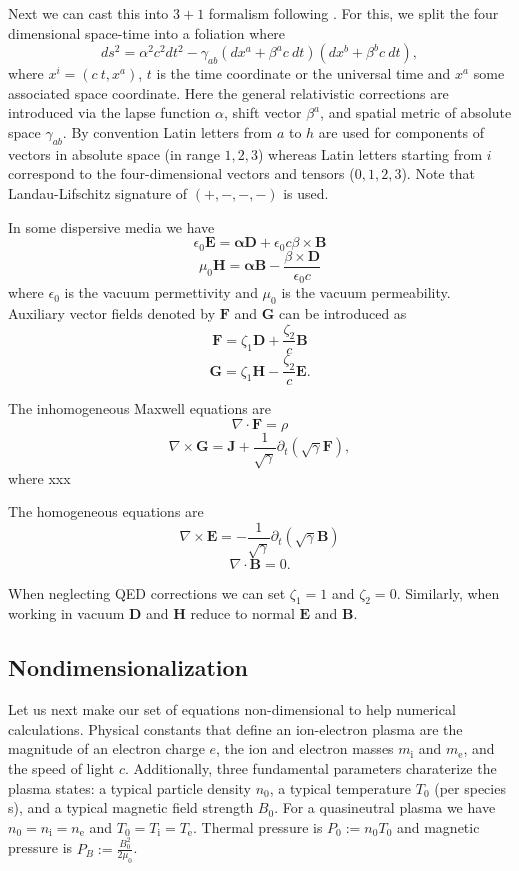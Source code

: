 \documentclass{aa}
\newcommand{\be}{\begin{equation}}
\newcommand{\ee}{\end{equation}}
\renewcommand{\vec}[1]{\ensuremath{\boldsymbol{#1}}}
\begin{document}
Next we can cast this into $3+1$ formalism following \citealt{P15}.
For this, we split the four dimensional space-time into a foliation where 
\be
ds^2 = \alpha^2 c^2 dt^2 - \gamma_{ab}(dx^a + \beta^a c~dt)(dx^b + \beta^b c~dt),
\ee
where $x^i = (c~t, x^a)$, $t$ is the time coordinate or the universal time and $x^a$ some associated space coordinate.
Here the general relativistic corrections are introduced via the lapse function $\alpha$, shift vector $\beta^a$, and spatial metric of absolute space $\gamma_{ab}$.
By convention Latin letters from $a$ to $h$ are used for components of vectors in absolute space (in range ${1,2,3}$) whereas Latin letters starting from $i$ correspond to the four-dimensional vectors and tensors (${0,1,2,3}$).
Note that Landau-Lifschitz signature of $(+,-,-,-)$ is used.

In some dispersive media we have
\be
\epsilon_0 \vec{E} = \vec{\alpha} \vec{D} + \epsilon_0 c \beta \times \vec{B}
\ee
\be
\mu_0 \vec{H} = \vec{\alpha} \vec{B} - \frac{\beta \times \vec{D}}{\epsilon_0 c}
\ee
where $\epsilon_0$ is the vacuum permettivity and $\mu_0$ is the vacuum permeability.
Auxiliary vector fields denoted by $\vec{F}$ and $\vec{G}$ can be introduced as
\be
\vec{F} = \zeta_1 \vec{D} + \frac{\zeta_2}{c} \vec{B}
\ee
\be
\vec{G} = \zeta_1 \vec{H} - \frac{\zeta_2}{c} \vec{E}.
\ee

The inhomogeneous Maxwell equations are
\be
\nabla \cdot \vec{F} = \rho
\ee
\be
\nabla \times \vec{G} = \vec{J} + \frac{1}{\sqrt{\gamma}} \partial_t (\sqrt{\gamma} \vec{F}),
\ee
where xxx

The homogeneous equations are
\be
\nabla \times \vec{E} = -\frac{1}{\sqrt{\gamma}} \partial_t (\sqrt{\gamma} \vec{B})\ee
\be
\nabla \cdot \vec{B} = 0.
\ee

When neglecting QED corrections we can set $\zeta_1=1$ and $\zeta_2=0$.
Similarly, when working in vacuum $\vec{D}$ and $\vec{H}$ reduce to normal $\vec{E}$ and $\vec{B}$.

\subsection{Nondimensionalization}
Let us next make our set of equations non-dimensional to help numerical calculations.
Physical constants that define an ion-electron plasma are the magnitude of an electron charge $e$, the ion and electron masses $m_{\mathrm{i}}$ and $m_{\mathrm{e}}$, and the speed of light $c$.
Additionally, three fundamental parameters charaterize the plasma states: a typical particle density $n_0$, a typical temperature $T_0$ (per species s), and a typical magnetic field strength $B_0$.
For a quasineutral plasma we have $n_0 = n_{\mathrm{i}} = n_{\mathrm{e}}$ and $T_0 = T_{\mathrm{i}} = T_{\mathrm{e}}$.
Thermal pressure is $P_0 := n_0 T_0$ and magnetic pressure is $P_B := \frac{B_0^2}{2 \mu_0}$.
\end{document}
